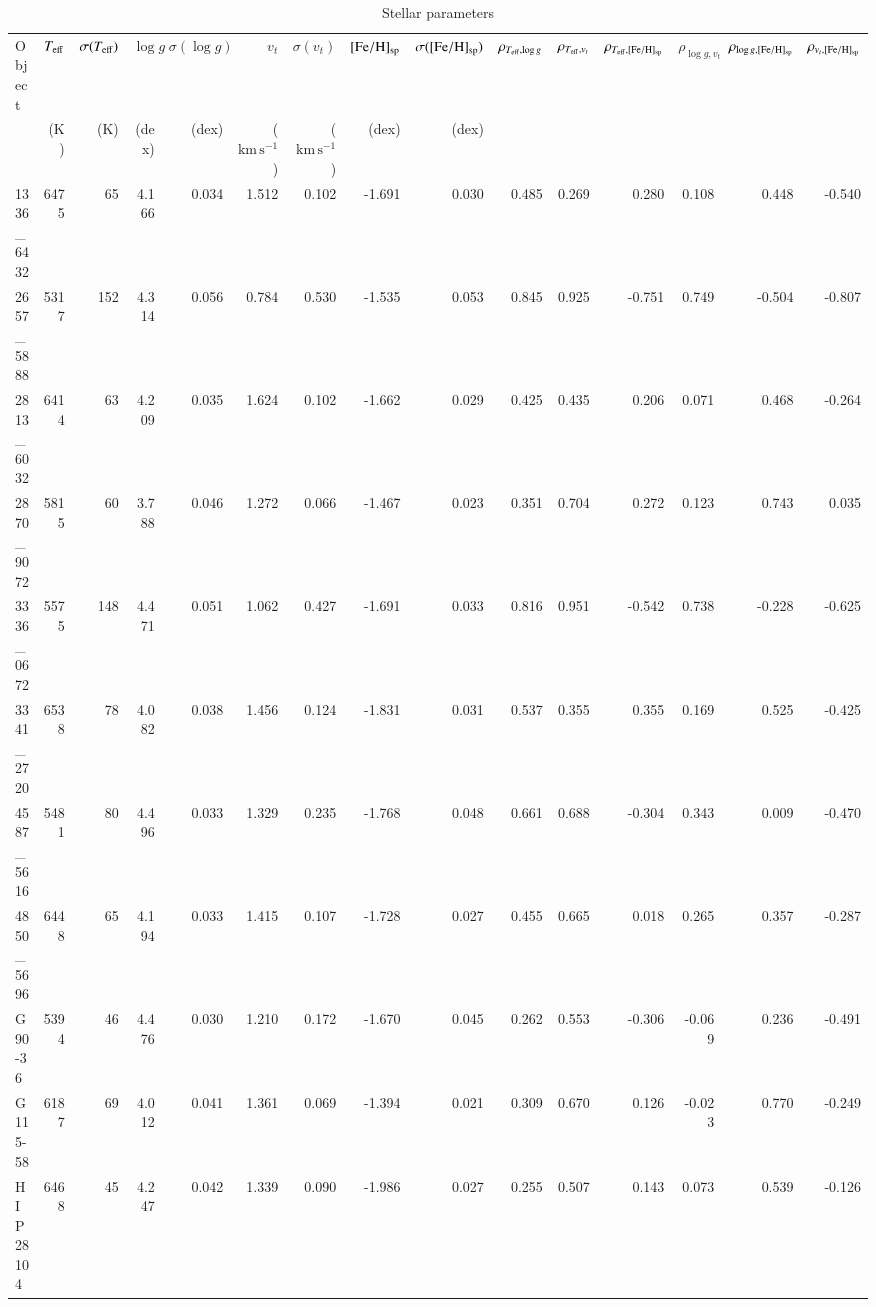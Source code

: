 \documentclass{aa}
\begin{document}
\begin{table}
  \caption{Stellar parameters\label{tab:parameters}}
  \centering
  \begin{tabular}{l*{14}{r}}
\hline\hline
Object & $T_{\rm eff}$ & $\sigma(T_{\rm eff})$ &  $\log g$ & $\sigma(\log g)$ & $v_t$ & $\sigma(v_t)$ &  $[\mathrm{Fe/H}]_{\rm sp}$ & $\sigma([\mathrm{Fe/H}]_{\rm sp})$ & $\rho_{T_{\rm eff},\log g}$ & $\rho_{T_{\rm eff},v_t}$ & $\rho_{T_{\rm eff},[\mathrm{Fe/H}]_{\rm sp}}$ &  $\rho_{\log g,v_t}$ & $\rho_{\log g,[\mathrm{Fe/H}]_{\rm sp}}$ & $\rho_{v_t,[\mathrm{Fe/H}]_{\rm sp}}$  \\
&($\mathrm{K}$)&($\mathrm{K}$)&(dex) &(dex) &($\mathrm{km\,s^{-1}}$)&($\mathrm{km\,s^{-1}}$)&(dex)&(dex)& & & & & & \\\hline
1336\_6432       & 6475 &   65 &  4.166&  0.034&  1.512&  0.102& -1.691&  0.030&  0.485&  0.269&  0.280&  0.108&  0.448& -0.540 \\
2657\_5888       & 5317 &  152 &  4.314&  0.056&  0.784&  0.530& -1.535&  0.053&  0.845&  0.925& -0.751&  0.749& -0.504& -0.807 \\
2813\_6032       & 6414 &   63 &  4.209&  0.035&  1.624&  0.102& -1.662&  0.029&  0.425&  0.435&  0.206&  0.071&  0.468& -0.264 \\
2870\_9072       & 5815 &   60 &  3.788&  0.046&  1.272&  0.066& -1.467&  0.023&  0.351&  0.704&  0.272&  0.123&  0.743&  0.035 \\
3336\_0672       & 5575 &  148 &  4.471&  0.051&  1.062&  0.427& -1.691&  0.033&  0.816&  0.951& -0.542&  0.738& -0.228& -0.625 \\
3341\_2720       & 6538 &   78 &  4.082&  0.038&  1.456&  0.124& -1.831&  0.031&  0.537&  0.355&  0.355&  0.169&  0.525& -0.425 \\
4587\_5616       & 5481 &   80 &  4.496&  0.033&  1.329&  0.235& -1.768&  0.048&  0.661&  0.688& -0.304&  0.343&  0.009& -0.470 \\
4850\_5696       & 6448 &   65 &  4.194&  0.033&  1.415&  0.107& -1.728&  0.027&  0.455&  0.665&  0.018&  0.265&  0.357& -0.287 \\
G90-36          & 5394 &   46 &  4.476&  0.030&  1.210&  0.172& -1.670&  0.045&  0.262&  0.553& -0.306& -0.069&  0.236& -0.491 \\
G115-58         & 6187 &   69 &  4.012&  0.041&  1.361&  0.069& -1.394&  0.021&  0.309&  0.670&  0.126& -0.023&  0.770& -0.249 \\
HIP28104        & 6468 &   45 &  4.247&  0.042&  1.339&  0.090& -1.986&  0.027&  0.255&  0.507&  0.143&  0.073&  0.539& -0.126 \\

\end{tabular}
\end{table}
\end{document}
